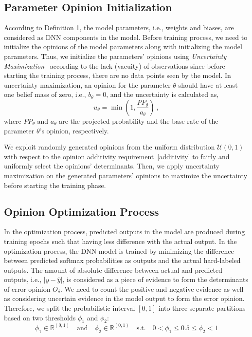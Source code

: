{\color{blue}
\subsection{Parameter Opinion Initialization}
\label{par_op_init}
According to Definition 1, the model parameters, i.e., weights and biases, are considered as DNN components in the model. Before training process, we need to initialize the opinions of the model parameters along with initializing the model parameters. Thus, we initialize the parameters' opinions using \emph{Uncertainty Maximization}~\cite{sl} according to the lack (vacuity) of observations since before starting the training process, there are no data points seen by the model. In uncertainty maximization, an opinion for the parameter $\theta$ should have at least one belief mass of zero, i.e., $b_{\theta} = 0$, and the uncertainty is calculated as,
\begin{equation}
    u_{\theta} = \min(1,\frac{PP_{\theta}}{a_{\theta}})\ ,
\end{equation}
where $PP_{\theta}$ and $a_{\theta}$ are the projected probability and the base rate of the parameter $\theta$'s opinion, respectively. 

We exploit randomly generated opinions from the uniform distribution $\mathcal{U}(0,1)$ with respect to the opinion additivity requirement~\ref{additivity} to fairly and uniformly select the opinions' determinants. Then, we apply uncertainty maximization on the generated parameters' opinions to maximize the uncertainty before starting the training phase.   
}

\subsection{Opinion Optimization Process}
\label{op_opt}
{\color{red} In the optimization process, predicted outputs in the model are produced during training epochs such that having less difference with the actual output.} {\color{blue} In the optimization process, the DNN model is trained by minimizing the difference between predicted softmax probabilities as outputs and the actual hard-labeled outputs.} The amount of absolute difference between actual and predicted outputs, i.e., $|y-\hat{y}|$, is considered as a piece of evidence to form the determinants of error opinion $O_{\delta}$. We need to count the positive and negative evidence as well as considering uncertain evidence in the model output to form the error opinion. Therefore, we split the probabilistic interval $[0,1]$ into three separate partitions based on two thresholds $\phi_1$ and $\phi_2$:
\[
\phi_1 \in \mathbb{R}^{(0,1)} \quad \text{and} \quad \phi_2 \in \mathbb{R}^{(0,1)} \quad \text{s.t.} \quad 0<\phi_1 \leq 0.5 \leq \phi_2< 1 
\]

